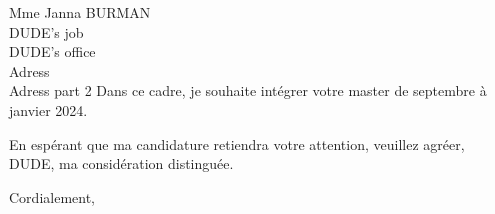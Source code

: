 \documentclass[12pt]{letter} %
\begin{document}
\begin{letter}{
        Mme Janna BURMAN \\
        DUDE's job \\
        DUDE's office \\
        Adress \\
        Adress part 2
    }
        Dans ce cadre, je souhaite intégrer votre master de septembre à janvier 2024.

        En espérant que ma candidature retiendra votre attention, veuillez agréer, DUDE, ma considération distinguée.

        \closing{Cordialement,}




    \end{letter}
\end{document}
